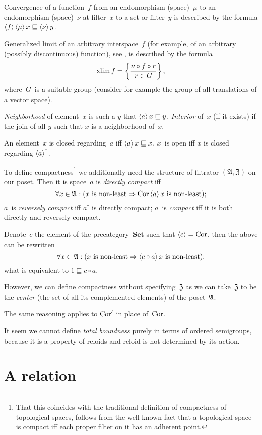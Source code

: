 Convergence of a function~$f$ from an endomorphism (space)~$\mu$ to an endomorphism (space)~$\nu$ at filter~$x$ to a set or filter~$y$ is described by the formula $\left\langle f\right\rangle\left\langle \mu\right\rangle x\sqsubseteq\left\langle \nu\right\rangle y$.

Generalized limit of an arbitrary interspace~$f$ (for example, of an arbitrary (possibly discontinuous) function), see \cite{limit}, is described by the formula \[ \operatorname{xlim} f=\left\{ \frac{\nu\circ f\circ r}{r\in G}\right\}, \]
where~$G$~is a suitable group (consider for example the group of all translations of a vector space).

\emph{Neighborhood} of element~$x$ is such a $y$ that $\left\langle a\right\rangle x\sqsubseteq y$. \emph{Interior} of~$x$ (if it exists) if the join of all $y$ such that $x$ is a neighborhood of~$x$.

An element~$x$ is closed regarding~$a$ iff $\left\langle a\right\rangle x\sqsubseteq x$. $x$~is open iff $x$ is closed regarding $\left\langle a\right\rangle^{\dagger}$.

To define compactness\footnote{That this coincides with the traditional definition of compactness of topological spaces, follows from the well known fact that a topological space is compact iff each proper filter on it has an adherent point.} we additionally need the structure of filtrator $(\mathfrak{A},\mathfrak{Z})$ on our poset. Then it is space~$a$ is \emph{directly compact} iff
\[\forall x\in\mathfrak{A}:(x\text{ is non-least}\Rightarrow\operatorname{Cor}\left\langle a\right\rangle x\text{ is non-least}); \]
$a$~is \emph{reversely compact} iff $a^{\dagger}$ is directly compact; $a$~is \emph{compact} iff it is both directly and reversely compact.

Denote~$c$ the element of the precategory~$\mathbf{Set}$ such that
$\left\langle c\right\rangle=\operatorname{Cor}$, then the above can be rewritten
\[\forall x\in\mathfrak{A}:(x\text{ is non-least}\Rightarrow\left\langle c\circ a\right\rangle x\text{ is non-least}); \]
what is equivalent to $1 \sqsubseteq c\circ a$.

However, we can define compactness without specifying~$\mathfrak{Z}$ as we can take~$\mathfrak{Z}$ to be the \emph{center} (the set of all its complemented elements) of the poset~$\mathfrak{A}$.

The same reasoning applies to $\operatorname{Cor}'$ in place of~$\operatorname{Cor}$.

It seem we cannot define \emph{total boundness} purely in terms of ordered semigroups, because it is a property of reloids and reloid is not determined by its action.

\chapter{A relation}


